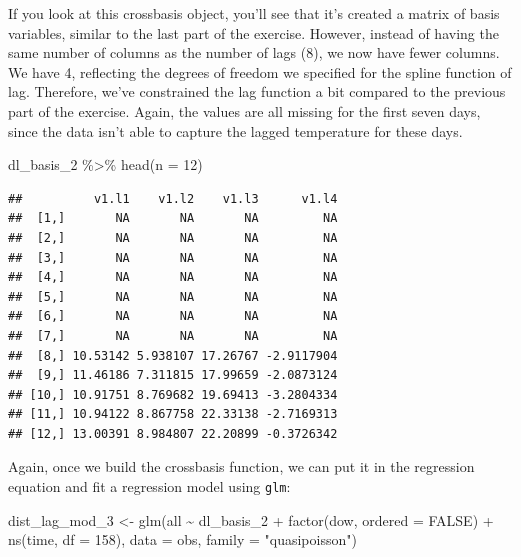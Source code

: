 \documentclass[
]{book}
\newenvironment{Shaded}{\begin{snugshade}}{\end{snugshade}}
\newcommand{\AttributeTok}[1]{\textcolor[rgb]{0.77,0.63,0.00}{#1}}
\newcommand{\ConstantTok}[1]{\textcolor[rgb]{0.00,0.00,0.00}{#1}}
\newcommand{\DecValTok}[1]{\textcolor[rgb]{0.00,0.00,0.81}{#1}}
\newcommand{\FunctionTok}[1]{\textcolor[rgb]{0.00,0.00,0.00}{#1}}
\newcommand{\NormalTok}[1]{#1}
\newcommand{\OtherTok}[1]{\textcolor[rgb]{0.56,0.35,0.01}{#1}}
\newcommand{\SpecialCharTok}[1]{\textcolor[rgb]{0.00,0.00,0.00}{#1}}
\newcommand{\StringTok}[1]{\textcolor[rgb]{0.31,0.60,0.02}{#1}}
\begin{document}
If you look at this crossbasis object, you'll see that it's created a matrix of basis
variables, similar to the last part of the exercise. However, instead of having the same
number of columns as the number of lags (8), we now have fewer columns. We have 4, reflecting
the degrees of freedom we specified for the spline function of lag. Therefore, we've
constrained the lag function a bit compared to the previous part of the exercise. Again,
the values are all missing for the first seven days, since the data isn't able to capture
the lagged temperature for these days.

\begin{Shaded}
\begin{Highlighting}[]
\NormalTok{dl\_basis\_2 }\SpecialCharTok{\%\textgreater{}\%} 
  \FunctionTok{head}\NormalTok{(}\AttributeTok{n =} \DecValTok{12}\NormalTok{)}
\end{Highlighting}
\end{Shaded}

\begin{verbatim}
##          v1.l1    v1.l2    v1.l3      v1.l4
##  [1,]       NA       NA       NA         NA
##  [2,]       NA       NA       NA         NA
##  [3,]       NA       NA       NA         NA
##  [4,]       NA       NA       NA         NA
##  [5,]       NA       NA       NA         NA
##  [6,]       NA       NA       NA         NA
##  [7,]       NA       NA       NA         NA
##  [8,] 10.53142 5.938107 17.26767 -2.9117904
##  [9,] 11.46186 7.311815 17.99659 -2.0873124
## [10,] 10.91751 8.769682 19.69413 -3.2804334
## [11,] 10.94122 8.867758 22.33138 -2.7169313
## [12,] 13.00391 8.984807 22.20899 -0.3726342
\end{verbatim}

Again, once we build the crossbasis function, we can put it in the regression equation and
fit a regression model using \texttt{glm}:

\begin{Shaded}
\begin{Highlighting}[]
\NormalTok{dist\_lag\_mod\_3 }\OtherTok{\textless{}{-}} \FunctionTok{glm}\NormalTok{(all }\SpecialCharTok{\textasciitilde{}}\NormalTok{ dl\_basis\_2 }\SpecialCharTok{+} 
                        \FunctionTok{factor}\NormalTok{(dow, }\AttributeTok{ordered =} \ConstantTok{FALSE}\NormalTok{) }\SpecialCharTok{+}
                          \FunctionTok{ns}\NormalTok{(time, }\AttributeTok{df =} \DecValTok{158}\NormalTok{), }
                        \AttributeTok{data =}\NormalTok{ obs, }\AttributeTok{family =} \StringTok{"quasipoisson"}\NormalTok{)}
\end{Highlighting}
\end{Shaded}
\end{document}
